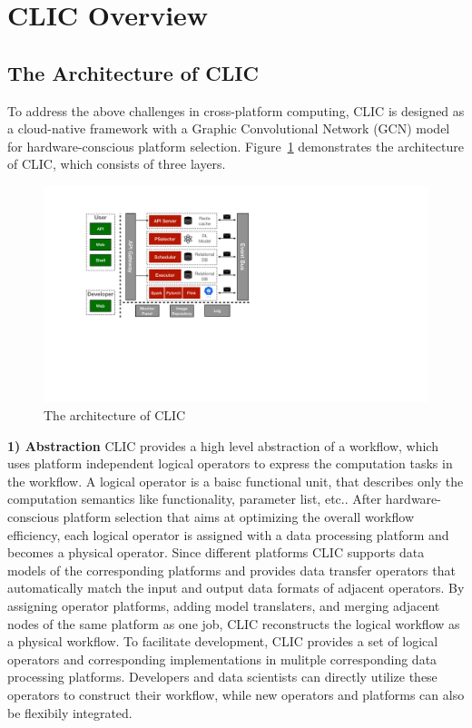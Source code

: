 
\section{CLIC Overview}

\subsection{The Architecture of CLIC}

To address the above challenges in cross-platform computing, CLIC is designed as a cloud-native framework with a Graphic Convolutional Network (GCN) model for hardware-conscious platform selection.
Figure~\ref{fig:architecture} demonstrates the architecture of CLIC, which consists of three layers. 



\begin{figure}[tbh]
  \centering
  \includegraphics[width=0.8\linewidth]{figures/CLIC-arch-2.pdf}
  \caption{The architecture of CLIC}
  \label{fig:architecture}
\end{figure}

\textbf{1) Abstraction} CLIC provides a high level abstraction of a workflow, which uses platform independent logical operators to express the computation tasks in the workflow. A logical operator is a baisc functional unit, that describes only the computation semantics like functionality, parameter list, etc.. 
After hardware-conscious platform selection that aims at optimizing the overall workflow efficiency, each logical operator is assigned with a data processing platform and becomes a physical operator. 
Since different platforms CLIC supports data models of the corresponding platforms and provides data transfer operators that automatically match the input and output data formats of adjacent operators.
By assigning operator platforms, adding model translaters, and merging adjacent nodes of the same platform as one job, CLIC reconstructs the logical workflow as a physical workflow.
To facilitate development, CLIC provides a set of logical operators and corresponding implementations in mulitple corresponding data processing platforms.
Developers and data scientists can directly utilize these operators to construct their workflow, while new operators and platforms can also be flexibily integrated.


